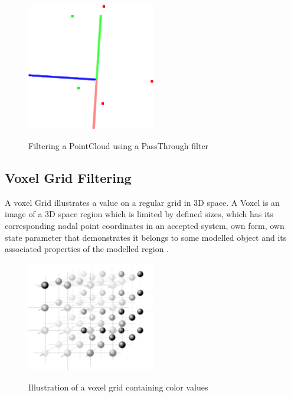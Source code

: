 \documentclass[12pt]{report}
\begin{document}
\begin{figure}[H]%
  \centering
  \includegraphics[width=0.5\textwidth]{passthrough_2.png}
 \caption{Filtering a PointCloud using a PassThrough filter}\cite[]{Rusu_ICRA2011_PCL}
 \label{fig:pass_through} 
\end{figure}



\subsection{Voxel Grid Filtering}
\label{section:Voxel Grid Filtering}

A voxel Grid illustrates a value on a regular grid in 3D space. A Voxel is an image of a 3D space region  which is limited by defined sizes, which has its corresponding nodal point coordinates in an accepted system,
own form, own state parameter that demonstrates it belongs to some modelled object and its associated properties of the modelled region . 

\begin{figure}[H]%
  \centering
  \includegraphics[width=0.5\textwidth]{220px-Voxelgitter.png}
 \caption{Illustration of a voxel grid containing color values}\cite[]{SHCHUROVA201576}
 \label{fig:voxel_repre} 
\end{figure}
\end{document}
